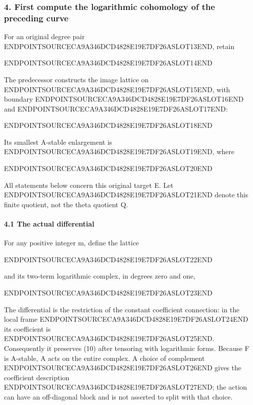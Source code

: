 \subsubsection{4. First compute the logarithmic cohomology of the preceding curve}\label{endpoint-exponential_original--first-compute-the-logarithmic-cohomology-of-the-preceding-curve}

For an original degree pair ENDPOINTSOURCECA9A346DCD4828E19E7DF26ASLOT13END, retain

ENDPOINTSOURCECA9A346DCD4828E19E7DF26ASLOT14END

The predecessor constructs the image lattice on ENDPOINTSOURCECA9A346DCD4828E19E7DF26ASLOT15END, with boundary ENDPOINTSOURCECA9A346DCD4828E19E7DF26ASLOT16END and ENDPOINTSOURCECA9A346DCD4828E19E7DF26ASLOT17END:

ENDPOINTSOURCECA9A346DCD4828E19E7DF26ASLOT18END

Its smallest A-stable enlargement is ENDPOINTSOURCECA9A346DCD4828E19E7DF26ASLOT19END, where

ENDPOINTSOURCECA9A346DCD4828E19E7DF26ASLOT20END

All statements below concern this original target E. Let ENDPOINTSOURCECA9A346DCD4828E19E7DF26ASLOT21END denote this finite quotient, not the theta quotient Q.

\paragraph{4.1 The actual differential}\label{endpoint-exponential_original--the-actual-differential}

For any positive integer m, define the lattice

ENDPOINTSOURCECA9A346DCD4828E19E7DF26ASLOT22END

and its two-term logarithmic complex, in degrees zero and one,

ENDPOINTSOURCECA9A346DCD4828E19E7DF26ASLOT23END

The differential is the restriction of the constant coefficient connection: in the local frame ENDPOINTSOURCECA9A346DCD4828E19E7DF26ASLOT24END its coefficient is ENDPOINTSOURCECA9A346DCD4828E19E7DF26ASLOT25END. Consequently it preserves (10) after tensoring with logarithmic forms. Because F is A-stable, A acts on the entire complex. A choice of complement ENDPOINTSOURCECA9A346DCD4828E19E7DF26ASLOT26END gives the coefficient description ENDPOINTSOURCECA9A346DCD4828E19E7DF26ASLOT27END; the action can have an off-diagonal block and is not asserted to split with that choice.

